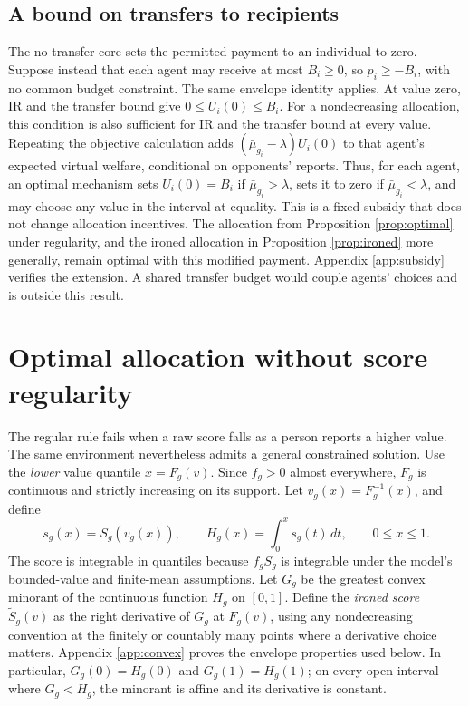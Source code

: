 \documentclass[11pt]{article}
\begin{document}
\subsection*{A bound on transfers to recipients}

The no-transfer core sets the permitted payment to an individual to zero. Suppose instead that each agent may receive at most $B_i\ge0$, so $p_i\ge-B_i$, with no common budget constraint. The same envelope identity applies. At value zero, IR and the transfer bound give $0\le U_i(0)\le B_i$. For a nondecreasing allocation, this condition is also sufficient for IR and the transfer bound at every value. Repeating the objective calculation adds $(\bar\mu_{g_i}-\lambda)U_i(0)$ to that agent's expected virtual welfare, conditional on opponents' reports. Thus, for each agent, an optimal mechanism sets $U_i(0)=B_i$ if $\bar\mu_{g_i}>\lambda$, sets it to zero if $\bar\mu_{g_i}<\lambda$, and may choose any value in the interval at equality. This is a fixed subsidy that does not change allocation incentives. The allocation from Proposition \ref{prop:optimal} under regularity, and the ironed allocation in Proposition \ref{prop:ironed} more generally, remain optimal with this modified payment. Appendix \ref{app:subsidy} verifies the extension. A shared transfer budget would couple agents' choices and is outside this result.

\section{Optimal allocation without score regularity}\label{sec:ironing}

The regular rule fails when a raw score falls as a person reports a higher value. The same environment nevertheless admits a general constrained solution. Use the \emph{lower} value quantile $x=F_g(v)$. Since $f_g>0$ almost everywhere, $F_g$ is continuous and strictly increasing on its support. Let $v_g(x)=F_g^{-1}(x)$, and define
\begin{equation}\label{eq:irondef}
s_g(x)=S_g(v_g(x)),\qquad
H_g(x)=\int_0^x s_g(t)\,dt,\qquad 0\le x\le1.
\end{equation}
The score is integrable in quantiles because $f_gS_g$ is integrable under the model's bounded-value and finite-mean assumptions. Let $G_g$ be the greatest convex minorant of the continuous function $H_g$ on $[0,1]$. Define the \emph{ironed score} $\widetilde S_g(v)$ as the right derivative of $G_g$ at $F_g(v)$, using any nondecreasing convention at the finitely or countably many points where a derivative choice matters. Appendix \ref{app:convex} proves the envelope properties used below. In particular, $G_g(0)=H_g(0)$ and $G_g(1)=H_g(1)$; on every open interval where $G_g<H_g$, the minorant is affine and its derivative is constant.
\end{document}
